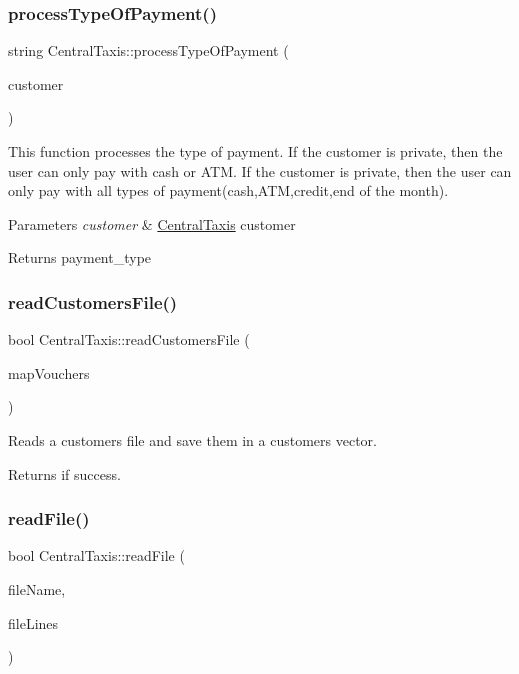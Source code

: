 \subsubsection{\texorpdfstring{process\+Type\+Of\+Payment()}{processTypeOfPayment()}}
{\footnotesize\ttfamily string Central\+Taxis\+::process\+Type\+Of\+Payment (\begin{DoxyParamCaption}\item[{\hyperlink{classCustomer}{Customer} $\ast$}]{customer }\end{DoxyParamCaption})}

This function processes the type of payment. If the customer is private, then the user can only pay with cash or A\+TM. If the customer is private, then the user can only pay with all types of payment(cash,\+A\+T\+M,credit,end of the month). 
\begin{DoxyParams}{Parameters}
{\em customer} & \hyperlink{classCentralTaxis}{Central\+Taxis} customer \\
\hline
\end{DoxyParams}
\begin{DoxyReturn}{Returns}
payment\+\_\+type 
\end{DoxyReturn}
\hypertarget{classCentralTaxis_abf02cd0c1df2362782871eef2bf4286a}{}\label{classCentralTaxis_abf02cd0c1df2362782871eef2bf4286a} 
\subsubsection{\texorpdfstring{read\+Customers\+File()}{readCustomersFile()}}
{\footnotesize\ttfamily bool Central\+Taxis\+::read\+Customers\+File (\begin{DoxyParamCaption}\item[{const map$<$ int, \hyperlink{classVoucher}{Voucher} $\ast$$>$ \&}]{map\+Vouchers }\end{DoxyParamCaption})}

Reads a customers file and save them in a customers vector. \begin{DoxyReturn}{Returns}
if success. 
\end{DoxyReturn}
\hypertarget{classCentralTaxis_a5eec3e0f79f237dffd86ce7971ea8697}{}\label{classCentralTaxis_a5eec3e0f79f237dffd86ce7971ea8697} 
\subsubsection{\texorpdfstring{read\+File()}{readFile()}}
{\footnotesize\ttfamily bool Central\+Taxis\+::read\+File (\begin{DoxyParamCaption}\item[{const string \&}]{file\+Name,  }\item[{vector$<$ string $>$ \&}]{file\+Lines }\end{DoxyParamCaption})}


